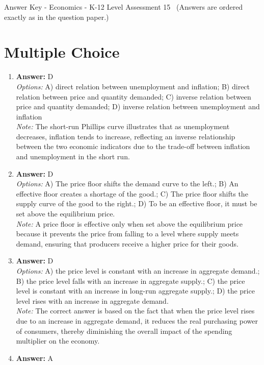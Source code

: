 \documentclass[12pt]{article}
\begin{document}
\begin{center}
Answer Key - Economics - K-12 Level Assessment 15 \
\small (Answers are ordered exactly as in the question paper.)
\end{center}

\section*{Multiple Choice}
\begin{enumerate}[label=\arabic*.]
\item \textbf{Answer:} D
\\ \textit{Options:} A) direct relation between unemployment and inflation; B) direct relation between price and quantity demanded; C) inverse relation between price and quantity demanded; D) inverse relation between unemployment and inflation
\\ \textit{Note:} The short-run Phillips curve illustrates that as unemployment decreases, inflation tends to increase, reflecting an inverse relationship between the two economic indicators due to the trade-off between inflation and unemployment in the short run.
\item \textbf{Answer:} D
\\ \textit{Options:} A) The price floor shifts the demand curve to the left.; B) An effective floor creates a shortage of the good.; C) The price floor shifts the supply curve of the good to the right.; D) To be an effective floor, it must be set above the equilibrium price.
\\ \textit{Note:} A price floor is effective only when set above the equilibrium price because it prevents the price from falling to a level where supply meets demand, ensuring that producers receive a higher price for their goods.
\item \textbf{Answer:} D
\\ \textit{Options:} A) the price level is constant with an increase in aggregate demand.; B) the price level falls with an increase in aggregate supply.; C) the price level is constant with an increase in long-run aggregate supply.; D) the price level rises with an increase in aggregate demand.
\\ \textit{Note:} The correct answer is based on the fact that when the price level rises due to an increase in aggregate demand, it reduces the real purchasing power of consumers, thereby diminishing the overall impact of the spending multiplier on the economy.
\item \textbf{Answer:} A

\end{enumerate}
\end{document}
